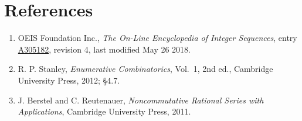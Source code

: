 \documentclass[11pt]{article}
\theoremstyle{definition}
\begin{document}
\section{References}

\begin{enumerate}

\item OEIS Foundation Inc., \emph{The On-Line Encyclopedia of Integer Sequences}, entry \href{https://oeis.org/A305182}{A305182}, revision 4, last modified May 26 2018.

\item R. P. Stanley, \emph{Enumerative Combinatorics}, Vol.~1, 2nd ed., Cambridge University Press, 2012; \S4.7.

\item J. Berstel and C. Reutenauer, \emph{Noncommutative Rational Series with Applications}, Cambridge University Press, 2011.

\end{enumerate}
\end{document}
